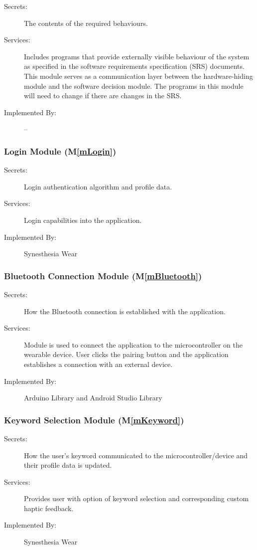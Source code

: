\documentclass[12pt, titlepage]{article}
\newcommand{\mref}[1]{M\ref{#1}}
\begin{document}
\begin{description}
\item[Secrets:]The contents of the required behaviours.
\item[Services:]Includes programs that provide externally visible behaviour of
  the system as specified in the software requirements specification (SRS)
  documents. This module serves as a communication layer between the
  hardware-hiding module and the software decision module. The programs in this
  module will need to change if there are changes in the SRS.
\item[Implemented By:] --
\end{description}

\subsubsection{Login Module (\mref{mLogin})}
\begin{description}
\item[Secrets:] Login authentication algorithm and profile data. 
\item[Services:] Login capabilities into the application.
\item[Implemented By:] Synesthesia Wear
\end{description}

\subsubsection{Bluetooth Connection Module (\mref{mBluetooth})}
\begin{description}
  \item[Secrets:] How the Bluetooth connection is established with the application.
  \item[Services:] Module is used to connect the application to the microcontroller on the wearable device. User clicks the pairing button and the application establishes a connection with an external device.
  \item[Implemented By:] Arduino Library and Android Studio Library
  \end{description}

\subsubsection{Keyword Selection Module (\mref{mKeyword})}
\begin{description}
  \item[Secrets:] How the user’s keyword communicated to the microcontroller/device and their profile data is updated.
  \item[Services:] Provides user with option of keyword selection and corresponding custom haptic feedback.
  \item[Implemented By:] Synesthesia Wear
  \end{description}
\end{document}
